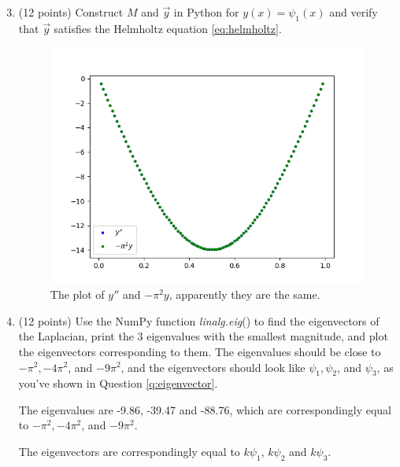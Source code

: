 \documentclass[10pt]{article}
\begin{document}
\begin{enumerate}[label=2.\arabic*]
\setcounter{enumi}{2}

    \item (12 points) 
    Construct $M$ and $\vec{y}$ in Python for $y(x)=\psi_{1}(x)$ and verify that $\vec{y}$ satisfies the Helmholtz equation \ref{eq:helmholtz}.
   	\begin{figure}[H]
    	\centering
    	\includegraphics[scale=0.7]{Eigenvectors/Helmholtz.png}
    	\caption{The plot of $y''$ and $-\pi^2y$, apparently they are the same.}
    \end{figure}
    \item (12 points) 
    Use the NumPy function \textit{linalg.eig}() to find the eigenvectors of the Laplacian, 
    print the 3 eigenvalues with the smallest magnitude, 
    and plot the eigenvectors corresponding to them.
    The eigenvalues should be close to $-\pi^{2},-4 \pi^{2}$, and $-9 \pi^{2}$, 
    and the eigenvectors should look like $\psi_{1}, \psi_{2}$, and $\psi_{3}$, as you've shown in Question \ref{q:eigenvector}.\par
	The eigenvalues are -9.86, -39.47 and -88.76, which are correspondingly equal to  $-\pi^{2},-4 \pi^{2}$, and $-9 \pi^{2}$.\par
	The eigenvectors are correspondingly equal to $k\psi_{1}$, $k\psi_{2}$ and $k\psi_{3}$. 

\end{enumerate}
\end{document}
